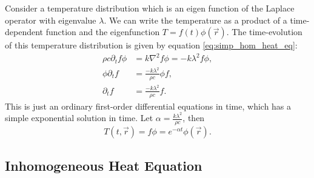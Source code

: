 \documentclass[letterpaper,12pt]{article}
\begin{document}
Consider a temperature distribution which is an eigen function of the Laplace operator with eigenvalue $\lambda$. We can write the temperature as a product of a time-dependent function
and the eigenfunction $T = f(t) \phi(\vec{r})$.
The time-evolution of this temperature distribution is given by equation \ref{eq:simp_hom_heat_eq}:
\begin{align}
  \label{eq:eigen_heat}
  \rho c \partial_t f \phi &= k \nabla^2 f \phi = -k \lambda^2 f \phi, \\
     \phi\partial_t f &= \frac{-k \lambda^2}{\rho c} \phi f, \\
         \partial_t f &= \frac{-k \lambda^2}{\rho c} f.
\end{align}
This is just an ordinary first-order differential equations in time, which has
a simple exponential solution in time. Let $\alpha = \frac{k \lambda^2}{\rho c}$, then
\begin{equation}
  \label{eq:homo_heat_sol}
  T(t,\vec{r}) = f\phi = e^{-\alpha t} \phi(\vec{r}).
\end{equation}


\subsection{Inhomogeneous Heat Equation}
\end{document}
